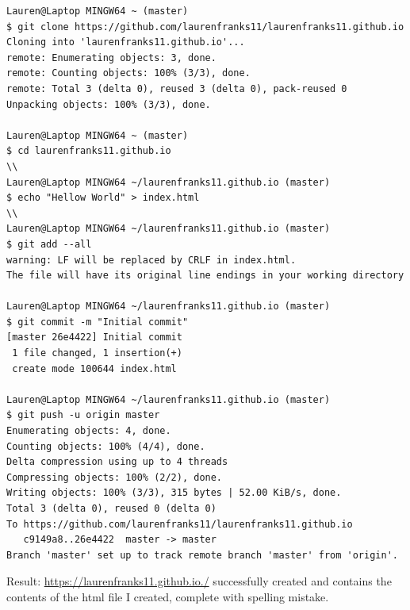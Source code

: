 \documentclass{article}
\begin{document}
\begin{verbatim}
Lauren@Laptop MINGW64 ~ (master)
$ git clone https://github.com/laurenfranks11/laurenfranks11.github.io
Cloning into 'laurenfranks11.github.io'...
remote: Enumerating objects: 3, done.
remote: Counting objects: 100% (3/3), done. 
remote: Total 3 (delta 0), reused 3 (delta 0), pack-reused 0 
Unpacking objects: 100% (3/3), done.

Lauren@Laptop MINGW64 ~ (master)
$ cd laurenfranks11.github.io
\\
Lauren@Laptop MINGW64 ~/laurenfranks11.github.io (master)
$ echo "Hellow World" > index.html
\\
Lauren@Laptop MINGW64 ~/laurenfranks11.github.io (master)
$ git add --all
warning: LF will be replaced by CRLF in index.html.
The file will have its original line endings in your working directory

Lauren@Laptop MINGW64 ~/laurenfranks11.github.io (master)
$ git commit -m "Initial commit"
[master 26e4422] Initial commit
 1 file changed, 1 insertion(+)
 create mode 100644 index.html

Lauren@Laptop MINGW64 ~/laurenfranks11.github.io (master)
$ git push -u origin master
Enumerating objects: 4, done.
Counting objects: 100% (4/4), done.
Delta compression using up to 4 threads
Compressing objects: 100% (2/2), done.
Writing objects: 100% (3/3), 315 bytes | 52.00 KiB/s, done.
Total 3 (delta 0), reused 0 (delta 0)
To https://github.com/laurenfranks11/laurenfranks11.github.io
   c9149a8..26e4422  master -> master
Branch 'master' set up to track remote branch 'master' from 'origin'.
\end{verbatim}

\noindent Result: \href{https://laurenfranks11.github.io./}{https://laurenfranks11.github.io./} successfully created and contains the contents of the html file I created, complete with spelling mistake. 
\end{document}
